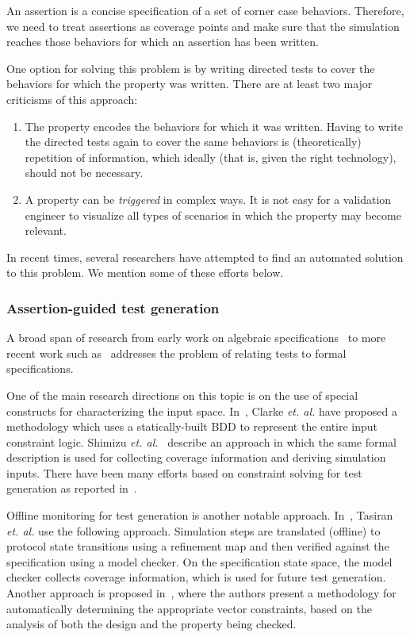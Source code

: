 \noindent
An assertion is a concise specification of a set of corner
case behaviors. Therefore, we need to treat assertions as coverage points
and make sure that the simulation reaches those behaviors for which an
assertion has been written.

\noindent
One option for solving this problem is by writing directed tests
to cover the behaviors for which the property was written. There are at least 
two major criticisms of this approach:
\begin{enumerate}

\item The property encodes the behaviors for which it was written. Having
    to write the directed tests again to cover the same behaviors is
    (theoretically) repetition of information, which ideally (that is,
    given the right technology), should not be necessary.

\item A property can be {\em triggered} in complex ways. It is not easy for
    a validation engineer to visualize all types of scenarios in which
    the property may become relevant.

\end{enumerate}

\noindent
In recent times, several researchers have attempted to find an 
automated solution to this problem. We mention some of these efforts 
below.

\subsubsection{Assertion-guided test generation}
A broad span of research from early work on algebraic
specifications~\cite{gannon:81} to more recent work such as~\cite{stocks:96}
addresses the problem of relating tests to formal specifications.

\noindent
One of the main research directions on this topic is on the use of special
constructs for characterizing the input space. In~\cite{clarke:00a}, Clarke
{\em et. al.} have proposed a methodology which uses a statically-built BDD
to represent the entire input constraint logic. Shimizu
{\em et. al.}~\cite{shimizu:02} describe an approach in which the same formal
description is used for collecting coverage information and deriving simulation
inputs.  There have been many efforts based on constraint solving for test
generation as reported in~\cite{huang:02}.

\noindent
Offline monitoring for test generation is another notable approach.
In~\cite{tasiran:03}, Tasiran {\em et. al.} use the following approach.
Simulation steps are translated (offline) to protocol state transitions using
a refinement map and then verified against the specification using a model
checker. On the specification state space, the model checker collects coverage
information, which is used for future test generation. Another approach is
proposed in~\cite{gupta:02}, where the authors present a methodology for 
automatically determining the appropriate vector constraints, based on the
analysis of both the design and the property being checked.

